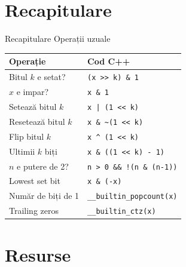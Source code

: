 ﻿\documentclass{beamer}
\begin{document}
\section{Recapitulare}

\begin{frame}[fragile]{Recapitulare \textemdash{} Operații uzuale}
  \begin{center}
  \begin{tabular}{ll}
    \toprule
    Operație & Cod C++ \\
    \midrule
    Bitul $k$ e setat?   & \lstinline|(x >> k) & 1| \\
    $x$ e impar?         & \lstinline|x & 1| \\
    Setează bitul $k$    & \lstinline+x | (1 << k)+ \\
    Resetează bitul $k$  & \lstinline|x & ~(1 << k)| \\
    Flip bitul $k$       & \lstinline|x ^ (1 << k)| \\
    Ultimii $k$ biți     & \lstinline|x & ((1 << k) - 1)| \\
    $n$ e putere de 2?   & \lstinline|n > 0 && !(n & (n-1))| \\
    Lowest set bit       & \lstinline|x & (-x)| \\
    Număr de biți de 1   & \lstinline|__builtin_popcount(x)| \\
    Trailing zeros       & \lstinline|__builtin_ctz(x)| \\
    \bottomrule
  \end{tabular}
  \end{center}
\end{frame}

\section{Resurse}
\end{document}
